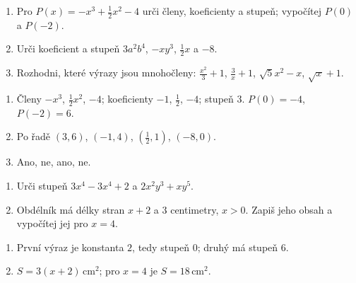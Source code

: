 \documentclass[11pt,a4paper]{article}
\begin{document}
\begin{zadaniReseniBox}[title={Samostatná práce 2},breakable=false]
\begin{enumerate}[label=\alph*)]
\item Pro $P(x)=-x^3+\frac12x^2-4$ urči členy, koeficienty a stupeň; vypočítej $P(0)$ a $P(-2)$.
\item Urči koeficient a stupeň $3a^2b^4$, $-xy^3$, $\frac12x$ a $-8$.
\item Rozhodni, které výrazy jsou mnohočleny: $\frac{x^2}{3}+1$, $\frac3x+1$, $\sqrt5x^2-x$, $\sqrt x+1$.
\end{enumerate}
\tcblower
\begin{enumerate}[label=\alph*)]
\item Členy $-x^3$, $\frac12x^2$, $-4$; koeficienty $-1$, $\frac12$, $-4$; stupeň $3$. $P(0)=-4$, $P(-2)=6$.
\item Po řadě $(3,6)$, $(-1,4)$, $(\frac12,1)$, $(-8,0)$.
\item Ano, ne, ano, ne.
\end{enumerate}
\end{zadaniReseniBox}

\begin{zadaniReseniBox}[title={Rozšíření 1},breakable=false]
\begin{enumerate}[label=\alph*)]
\item Urči stupeň $3x^4-3x^4+2$ a $2x^2y^3+xy^5$.
\item Obdélník má délky stran $x+2$ a $3$ centimetry, $x>0$. Zapiš jeho obsah a vypočítej jej pro $x=4$.
\end{enumerate}
\tcblower
\begin{enumerate}[label=\alph*)]
\item První výraz je konstanta $2$, tedy stupeň $0$; druhý má stupeň $6$.
\item $S=3(x+2)\,\mathrm{cm}^2$; pro $x=4$ je $S=18\,\mathrm{cm}^2$.
\end{enumerate}
\end{zadaniReseniBox}


\end{document}
